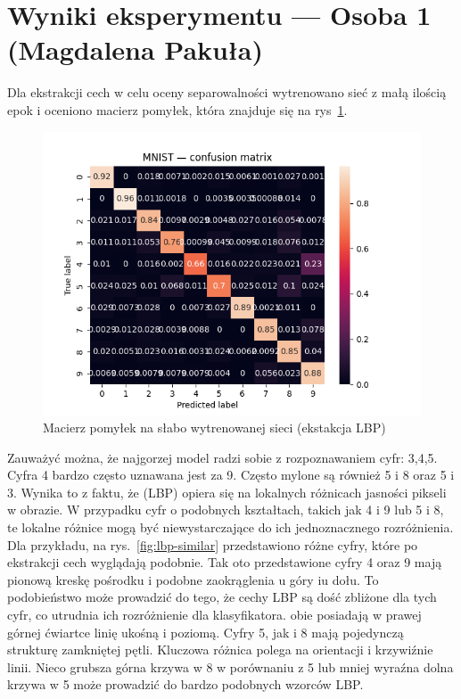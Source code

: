 \documentclass[10pt]{article}
\begin{document}
\pagebreak

\section{Wyniki eksperymentu --- Osoba 1 (Magdalena Pakuła)}
Dla ekstrakcji cech w celu oceny separowalności wytrenowano sieć z małą ilością epok i oceniono macierz pomyłek, która znajduje się na rys~\ref{fig:lbp-bad-cm}.

\begin{figure}[H]\centering
    \includegraphics[width=.3\linewidth]{img/LBP/LBP_MLP}
    \caption{Macierz pomyłek na słabo wytrenowanej sieci (ekstakcja LBP)}\label{fig:lbp-bad-cm}
\end{figure}

Zauważyć można, że najgorzej model radzi sobie z rozpoznawaniem cyfr: 3,4,5.
Cyfra 4 bardzo często uznawana jest za 9.
Często mylone są również 5 i 8 oraz 5 i 3.
Wynika to z faktu, że (LBP) opiera się na lokalnych różnicach jasności pikseli w obrazie. W przypadku cyfr o podobnych kształtach, takich jak 4 i 9 lub 5 i 8, te lokalne różnice mogą być niewystarczające do ich jednoznacznego rozróżnienia.
Dla przykładu, na rys.~\ref{fig:lbp-similar} przedstawiono różne cyfry, które po
ekstrakcji cech wyglądają podobnie.
Tak oto przedstawione cyfry 4 oraz 9 mają pionową kreskę pośrodku i podobne zaokrąglenia u góry iu dołu.
To podobieństwo może prowadzić do tego, że cechy LBP są dość zbliżone dla tych cyfr, co utrudnia ich rozróżnienie dla klasyfikatora.
obie posiadają w prawej górnej ćwiartce linię ukośną i poziomą.
Cyfry 5, jak i 8 mają pojedynczą strukturę zamkniętej pętli. Kluczowa różnica polega na orientacji i krzywiźnie linii.
Nieco grubsza górna krzywa w 8 w porównaniu z 5 lub mniej wyraźna dolna krzywa w 5 może prowadzić do bardzo podobnych wzorców LBP.
\end{document}
